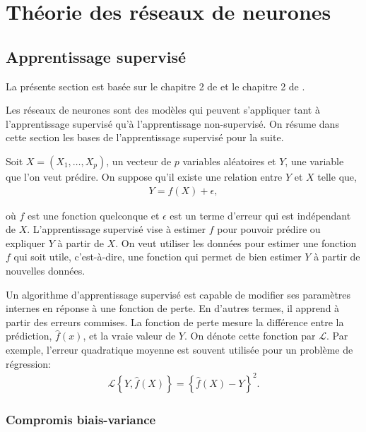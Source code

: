 \chapter{Théorie des réseaux de neurones}     
\label{chap:RN}                   

\section{Apprentissage supervisé}
\label{sec:RN:ML}

La présente section est basée sur le chapitre 2 de \citet{james2013introduction} et le chapitre 2 de \citet{Hastie/etal:2009}.

Les réseaux de neurones sont des modèles qui peuvent s'appliquer tant à l'apprentissage supervisé qu'à l'apprentissage non-supervisé. On résume dans cette section les bases de l'apprentissage supervisé pour la suite.

Soit $X=\left(X_1, \dots, X_p \right)$, un vecteur de $p$ variables aléatoires et $Y$, une variable que l'on veut prédire. On suppose qu'il existe une relation entre $Y$ et $X$ telle que,
\begin{align*}
Y = f(X) + \epsilon,
\end{align*} 

où $f$ est une fonction quelconque et $\epsilon$ est un terme d'erreur qui est indépendant de $X$. L'apprentissage supervisé vise à estimer $f$ pour pouvoir prédire ou expliquer $Y$ à partir de $X$. On veut utiliser les données pour estimer une fonction $f$ qui soit utile, c'est-à-dire, une fonction qui permet de bien estimer $Y$ à partir de nouvelles données. 

Un algorithme d'apprentissage supervisé est capable de modifier ses paramètres internes en réponse à une fonction de perte. En d'autres termes, il apprend à partir des erreurs commises.  La fonction de perte mesure la différence entre la prédiction, $\hat{f}(x)$, et la vraie valeur de $Y$. On dénote cette fonction par $\mathcal{L}$. Par exemple, l'erreur quadratique moyenne est souvent utilisée pour un problème de régression:
\begin{align*}
\mathcal{L} \left\{ Y, \hat{f}(X) \right\}= \left\{ \hat{f}(X) - Y\right\}^2.
\end{align*}

\subsection{Compromis biais-variance}
\label{subsec:RN:ML:biais-var}

